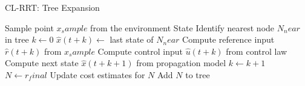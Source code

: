\begin{algorithm}
\caption{CL-RRT: Tree Expansion}
\label{alg:clrrt_expansion}
\begin{algorithmic}[1]
\State Sample point $x_sample$ from the environment
State Identify nearest node $N_near$ in tree
\State $k \gets 0$
\State $\hat{x}(t+k) \gets $ last state of $N_near$
	\State Compute reference input $\hat{r}(t+k)$ from $x_sample$
	\State Compute control input $\hat{u}(t+k)$ from control law
	\State Compute next state $\hat{x}(t+k+1)$ from propagation model
	\State $k \gets k+1$
\EndWhile
$N \gets r_final$
	\State Update cost estimates for $N$
	\State Add $N$ to tree
\EndFor
\end{algorithmic}
\end{algorithm}
